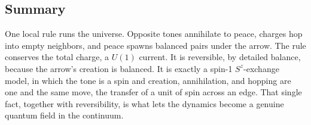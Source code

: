 \subsection{Summary}

One local rule runs the universe. Opposite tones annihilate to peace, charges hop into empty neighbors, and peace spawns balanced pairs under the arrow. The rule conserves the total charge, a $U(1)$ current. It is reversible, by detailed balance, because the arrow's creation is balanced. It is exactly a spin-1 $S^z$-exchange model, in which the tone is a spin and creation, annihilation, and hopping are one and the same move, the transfer of a unit of spin across an edge. That single fact, together with reversibility, is what lets the dynamics become a genuine quantum field in the continuum.
